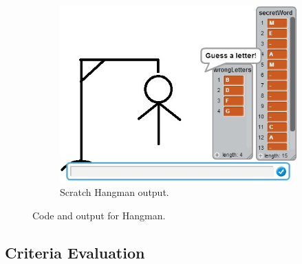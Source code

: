 \begin{figure}[h]
\begin{subfigure}[b]{0.45\textwidth}
\begin{center}
      \includegraphics[scale=0.5]{./pics/scratch_hang_out}
      \caption{Scratch Hangman output.}
      \label{fig:scratch_hang_out}
    \end{center}
    \end{subfigure}
    \caption{Code and output for Hangman.}
    \label{fig:scratch_hang}
\end{figure}

\subsection{Criteria Evaluation}

